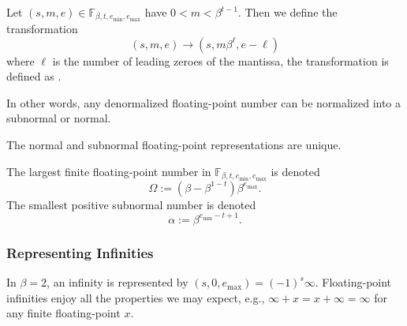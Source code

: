 \begin{defn}
Let $(s,m,e)\in\mathbb{F}_{\beta,t,e_{\text{min}},e_{\text{max}}}$
have $0<m<\beta^{t-1}$. Then we define the transformation
\begin{equation}
  (s,m,e)\to(s,m\beta^{\ell},e-\ell)
\end{equation}
where $\ell$ is the number of leading zeroes of the mantissa, the
transformation is defined as .
\end{defn}
\begin{rmk}
In other words, any denormalized floating-point number can be normalized
into a subnormal or normal.
\end{rmk}
\begin{thm}
The normal and subnormal floating-point representations are unique.
\end{thm}
\begin{defn}
  The largest finite floating-point number in $\mathbb{F}_{\beta,t,e_{\text{min}},e_{\text{max}}}$
  is denoted
  \begin{equation}
    \Omega := (\beta - \beta^{1-t})\beta^{e_{\text{max}}}.
  \end{equation}
  The smallest positive subnormal number is denoted
  \begin{equation}
    \alpha := \beta^{e_{\text{min}}-t+1}. 
  \end{equation}
\end{defn}

\subsubsection{Representing Infinities}

In $\beta=2$, an infinity is represented by $(s,0,e_{\text{max}})=(-1)^{s}\infty$.
Floating-point infinities enjoy all the properties we may expect, e.g.,
$\infty + x = x + \infty = \infty$ for any finite floating-point $x$.

